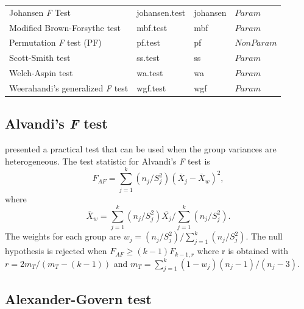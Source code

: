 \begin{table}[H]
\begin{tabular}{p{6.5cm}lll}
Johansen \textit{F} Test  & johansen.test & johansen & \textbf{$Param$} \\
Modified Brown-Forsythe test    & mbf.test   & mbf & \textbf{$Param$} \\
Permutation \textit{F} test (PF)   & pf.test   & pf & \textbf{$NonParam$} \\
Scott-Smith test  & ss.test  & ss & \textbf{$Param$} \\
Welch-Aspin test   & wa.test   & wa & \textbf{$Param$} \\
Weerahandi’s generalized \textit{F} test & wgf.test  & wgf & \textbf{$Param$} \\    
\hline
\end{tabular}
\label{oneway22tests}
\end{table}




\subsection{ Alvandi's \textit{F} test}
\citet{sadooghi2012} presented a practical test that can be used when the group variances are heterogeneous. The test statistic for Alvandi's \textit{F} test is
\begin{equation}
F_{AF}=\displaystyle\sum\limits_{j=1}^k (n_j/S_j^2)(\bar{X}_{j}-\bar{X}_{w})^2,
\end{equation}
where \begin{equation}\label{eq:Xw}
 \bar{X}_{w}=\displaystyle\sum\limits_{j=1}^k (n_j/S_j^2)\bar{X_j}/\displaystyle\sum\limits_{j=1}^k (n_j/S_j^2).    
\end{equation}
 The weights for each group are \begin{math} w_j=({n_j/S_j^2})/{\displaystyle\sum\limits_{j=1}^k (n_j/S_j^2)} \end{math}.
The null hypothesis is rejected when \begin{math} F_{AF}\geqslant(k-1) F_{k-1, r} \end{math} where r is obtained with \begin{math} r={2m_T}/({m_T-(k-1)}) \end{math} 
and \begin{math} m_T={\sum\limits_{j=1}^k (1-w_j)(n_{j}-1)/(n_j-3)} \end{math}.

\subsection{Alexander-Govern test} 

